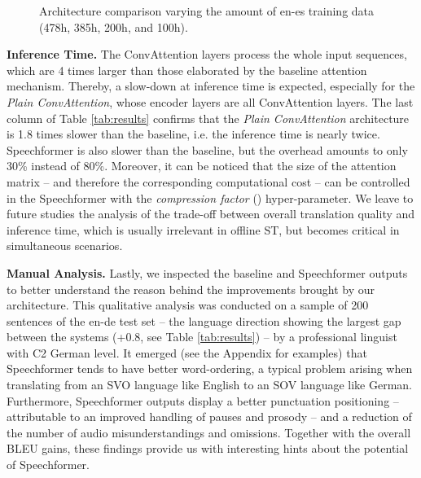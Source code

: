 \documentclass[11pt]{article}
\begin{document}
\begin{figure}[th]
\centering
{}
\caption{\label{fig:es_hours} Architecture comparison varying the amount of en-es training data (478h, 385h, 200h, and 100h).}
\end{figure}

\noindent \textbf{Inference Time.} 
The ConvAttention layers process the whole input sequences, which are 4 times larger than those elaborated by the baseline attention mechanism. Thereby, a slow-down at inference time is expected, especially for the \emph{Plain ConvAttention}, whose encoder layers are all ConvAttention layers.
The last column of Table \ref{tab:results} confirms that the \emph{Plain ConvAttention} architecture is 1.8 times slower than the baseline, i.e. the inference time is nearly twice. 
Speechformer is also
slower than the baseline, but the overhead amounts to only 30\% instead of 80\%.
Moreover, it can be noticed that the size of the attention matrix -- and therefore the corresponding computational cost -- can be controlled in the Speechformer with the \textit{compression factor} () hyper-parameter.
We leave to future studies the analysis of the trade-off between overall translation quality and inference time, which is usually irrelevant in offline ST, but becomes critical in simultaneous scenarios.

\noindent \textbf{Manual Analysis.}
Lastly, we inspected the baseline and Speechformer outputs to better understand the reason behind the improvements brought by our architecture.
This qualitative analysis was conducted on a sample of 200 sentences of the en-de test set -- the language direction showing the largest gap between the systems (+0.8, see Table \ref{tab:results}) -- by a professional linguist with C2 German level.
It emerged (see the Appendix for examples) that Speechformer tends to have better word-ordering, a typical problem arising when translating from an SVO language like English to an SOV language like German.
Furthermore, Speechformer outputs display a better punctuation positioning -- attributable to an improved
handling of pauses and prosody -- and a reduction of the number of audio misunderstandings and omissions.
Together with the overall BLEU gains, these findings provide us with interesting hints about the potential of Speechformer.
\end{document}
